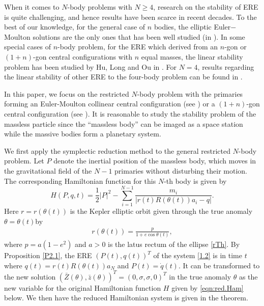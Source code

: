 \documentclass[11pt]{article}
\def\lb{\label}
\def\th{{\theta}}
\begin{document}
When it comes to $N$-body problems with $N \geq 4$, research on the stability of ERE is quite challenging, and hence results have been scarce in recent decades.
To the best of our knowledge,
for the general case of $n$ bodies, the elliptic Euler$-$Moulton solutions
are the only ones that has been well studied (in \cite{ZhonLong2017CMDA}).
In some special cases of $n$-body problem,
for the ERE which derived from an $n$-gon or $(1+n)$-gon central configurations with $n$ equal masses,
the linear stability problem has been studied by Hu, Long and Ou in \cite{Hu2020}.
For $N=4$, results 
regarding the linear stability of other ERE to the four-body problem can be found in \cite{Mansur2017, Leandro2018, Liu2021,LiZ, Leandro2003,zhou2023}.

In this paper, we focus on the restricted $N$-body problem with the primaries forming an Euler-Moulton collinear central configuration 
(see \cite{ZhonLong2017CMDA})
or a $(1+n)$-gon central configuration (see \cite{Maxwell,Hu2020}).
It is reasonable to study the stability problem of the
massless particle
since the
“massless body” can be imaged as a space station while the massive bodies form a planetary system.

We first apply the symplectic reduction method \cite{MS} to the general restricted $N$-body problem. 
Let $P$ denote the inertial position of the massless body, which moves in the gravitational field of the $N-1$ primaries without disturbing their motion. The corresponding 
 Hamiltonian function for this $N$-th body is given by
\begin{equation}
H(P,q, t)=\frac{1}{2}|P|^2-\sum_{i=1}^{N-1}
\frac{m_i}{|r(t)R(\th(t))a_i-q|}.\lb{HaFun}
\end{equation}
Here $r=r(\theta(t))$ is the Kepler elliptic orbit given through the true anomaly $\th=\th(t)$by
\begin{align}
  r(\th(t)) = \frac{p}{1+e\cos\th(t)},  \lb{rTh}
\end{align}
where $p=a(1-e^2)$ and $a>0$ is the latus rectum of the ellipse \eqref{rTh}.
By Proposition \ref{P2.1}, the ERE $(P(t),q(t))^T$  of the system \eqref{1.2} is in time $t$ where $q(t)=r(t)R(\theta(t))a_{N}$ and $P(t)=\dot{q}(t)$. It 
can be transformed to the new solution $(\bar{Z}(\theta),\bar{z}(\theta))^T = (0,\sigma,\sigma,0)^T$ in the true anomaly $\theta$ as the new
variable for the original Hamiltonian function $H$ given by \eqref{eqn:red.Ham} below. We then have the reduced Hamiltonian system is given in the theorem.
\end{document}

